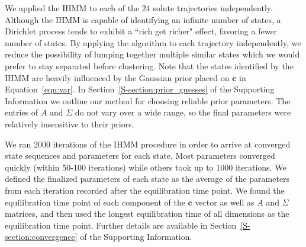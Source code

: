 \documentclass{article}
\begin{document}
  
  We applied the IHMM to each of the 24 solute trajectories independently.
  Although the IHMM is capable of identifying an infinite number of states, 
  a Dirichlet process tends to exhibit a ``rich get richer" effect, favoring
  a fewer number of states. By applying the algorithm to each trajectory 
  independently, we reduce the possibility of lumping together multiple 
  similar states which we would prefer to stay separated before clustering.
  Note that the states identified by the IHMM are heavily influenced by 
  the Gaussian prior placed on $\mathbf{c}$ in Equation~\ref{eqn:var}. 
  In Section~\ref{S-section:prior_guesses} of the Supporting Information we outline our method for 
  choosing reliable prior parameters. The entries of $A$ and $\Sigma$ do 
  not vary over a wide range, so the final parameters were relatively insensitive
  to their priors.
  

  We ran 2000 iterations of the IHMM procedure in order to arrive at converged 
  state sequences and parameters for each state. Most parameters converged 
  quickly (within 50-100 iterations) while others took up to 1000 iterations.
  We defined the finalized parameters of each state as the average of the 
  parameters from each iteration recorded after the equilibration time point.
  We found the equilibration time point of each component of the $\mathbf{c}$ 
  vector as well as $A$ and $\Sigma$ matrices, and then used the longest 
  equilibration time of all dimensions as the equilibration time point.
  Further details are available in Section~\ref{S-section:convergence} of
  the Supporting Information.
  
\end{document}
